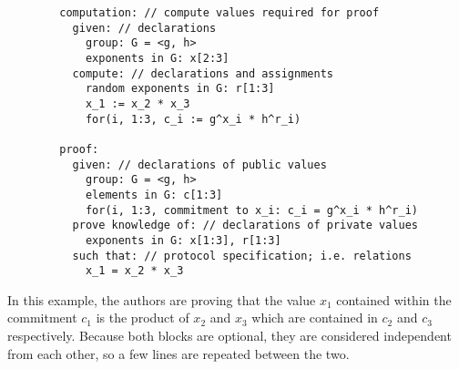 \documentclass{sig-alternate}
\begin{document}
		\begin{verbatim}
		computation: // compute values required for proof
		  given: // declarations
		    group: G = <g, h>
		    exponents in G: x[2:3]
		  compute: // declarations and assignments
		    random exponents in G: r[1:3]
		    x_1 := x_2 * x_3
		    for(i, 1:3, c_i := g^x_i * h^r_i)
		    
		proof:
		  given: // declarations of public values
		    group: G = <g, h>
		    elements in G: c[1:3]
		    for(i, 1:3, commitment to x_i: c_i = g^x_i * h^r_i)
		  prove knowledge of: // declarations of private values
		    exponents in G: x[1:3], r[1:3]
		  such that: // protocol specification; i.e. relations
		    x_1 = x_2 * x_3
		\end{verbatim}
		
		In this example, the authors are proving that the value $x_{1}$ contained within
		the commitment $c_{1}$ is the product of $x_{2}$ and $x_{3}$ which are contained
		in $c_{2}$ and $c_{3}$ respectively. Because both blocks are optional, they are
		considered independent from each other, so a few lines are repeated between the two.
		
\end{document}
